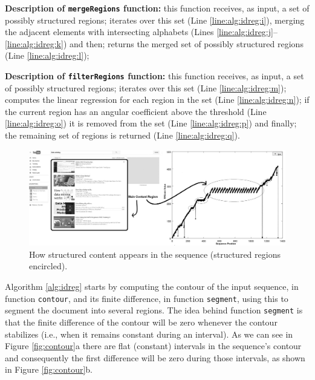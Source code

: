 \textbf{Description of \texttt{mergeRegions} function:} this function
receives, as input, a set of possibly structured regions; iterates over this set (Line
\ref{line:alg:idreg:i}), merging the adjacent elements with intersecting alphabets (Lines
\ref{line:alg:idreg:j}--\ref{line:alg:idreg:k}) and then; returns the merged set
of possibly structured regions (Line \ref{line:alg:idreg:l});

\textbf{Description of \texttt{filterRegions} function:} this function
receives, as input, a set of possibly structured regions; iterates over this set (Line
\ref{line:alg:idreg:m}); computes the linear regression for each region in the
set (Line \ref{line:alg:idreg:n}); if the current region has an angular
coefficient above the threshold (Line \ref{line:alg:idreg:o}) it is removed from the set
(Line \ref{line:alg:idreg:p}) and finally; the remaining set of regions is
returned (Line \ref{line:alg:idreg:q}).

\begin{figure}[h]
  \centering
     \includegraphics[width=440pt]{img/main-reg.jpg}
  \caption{\small{How structured content appears in the sequence (structured regions encircled).}}
  \label{fig:stru}
\end{figure}

Algorithm \ref{alg:idreg} starts by computing the contour of the input sequence,
in function \texttt{contour}, and its finite difference, in function
\texttt{segment}, using this to segment the document into several regions.
The idea behind function \texttt{segment} is that the finite difference of
the contour will be zero whenever the contour stabilizes (i.e., when it
remains constant during an interval). As we can see in Figure
\ref{fig:contour}a there are flat (constant) intervals in the sequence's
contour and consequently the first difference will be zero during those
intervals, as shown in Figure \ref{fig:contour}b.


